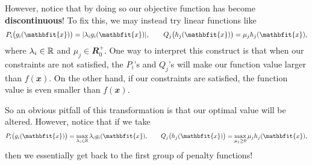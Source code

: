 \documentclass[math, code]{amznotes}
\theoremstyle{remark}
\begin{document}
However, notice that by doing so our objective function has become \textbf{discontinuous}! To fix this, we may instead try linear functions like
\begin{equation*}
    P_i\bigl(g_i(\mathbfit{x})\bigr) = \abs{\lambda_ig_i(\mathbfit{x})}, \qquad Q_j\bigl(h_j(\mathbfit{x})\bigr) = \mu_jh_j(\mathbfit{x}),
\end{equation*}
where $\lambda_i \in \mathbb{R}$ and $\mu_j \in \mathbfit{R}^+_0$. One way to interpret this construct is that when our constraints are not satisfied, the $P_i$'s and $Q_j$'s will make our function value larger than $f(\mathbfit{x})$. On the other hand, if our constraints are satisfied, the function value is even smaller than $f(\mathbfit{x})$.

So an obvious pitfall of this transformation is that our optimal value will be altered. However, notice that if we take
\begin{equation*}
    P_i\bigl(g_i(\mathbfit{x})\bigr) = \max_{\lambda_i \in \R}\lambda_ig_i(\mathbfit{x}), \qquad Q_j\bigl(h_j(\mathbfit{x})\bigr) = \max_{\mu_j \geq 0}\mu_jh_j(\mathbfit{x}),
\end{equation*}
then we essentially get back to the first group of penalty functions! 
\end{document}
